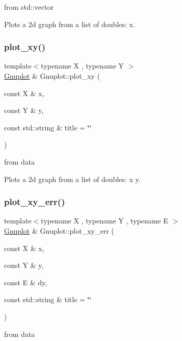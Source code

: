 from std\+::vector 

Plots a 2d graph from a list of doubles\+: x. \mbox{\label{class_gnuplot_a0514a7391de6b42e79732ce746c310f7}} 
\subsubsection{\texorpdfstring{plot\+\_\+xy()}{plot\_xy()}}
{\footnotesize\ttfamily template$<$typename X , typename Y $>$ \\
\mbox{\hyperlink{class_gnuplot}{Gnuplot}} \& Gnuplot\+::plot\+\_\+xy (\begin{DoxyParamCaption}\item[{const X \&}]{x,  }\item[{const Y \&}]{y,  }\item[{const std\+::string \&}]{title = {\ttfamily \char`\"{}\char`\"{}} }\end{DoxyParamCaption})}



from data 

Plots a 2d graph from a list of doubles\+: x y. \mbox{\label{class_gnuplot_a3c5d382eba33f92b26ba85f201bc7dea}} 
\subsubsection{\texorpdfstring{plot\+\_\+xy\+\_\+err()}{plot\_xy\_err()}}
{\footnotesize\ttfamily template$<$typename X , typename Y , typename E $>$ \\
\mbox{\hyperlink{class_gnuplot}{Gnuplot}} \& Gnuplot\+::plot\+\_\+xy\+\_\+err (\begin{DoxyParamCaption}\item[{const X \&}]{x,  }\item[{const Y \&}]{y,  }\item[{const E \&}]{dy,  }\item[{const std\+::string \&}]{title = {\ttfamily \char`\"{}\char`\"{}} }\end{DoxyParamCaption})}



from data 





